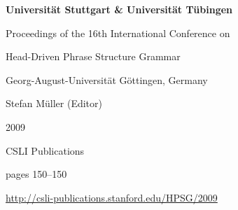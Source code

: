 \documentclass[a4paper,11pt]{article}
\begin{document}
\begin{center}
  {\huge\bf Universit\"{a}t Stuttgart & Universit\"{a}t T\"{u}bingen\par}

  \bigskip

  {\LARGE  \par}

  \vspace*{3\bigskipamount}

  Proceedings of the 16th International Conference on\par Head-Driven Phrase Structure Grammar

  \bigskip

  Georg-August-Universit\"{a}t G\"{o}ttingen, Germany

  \medskip

  Stefan Müller (Editor)

  \medskip

  2009

  \medskip

  CSLI Publications

  \medskip

  pages 150--150

  \medskip

  \url{http://csli-publications.stanford.edu/HPSG/2009}
\end{center}

\newpage

        
\end{document}
